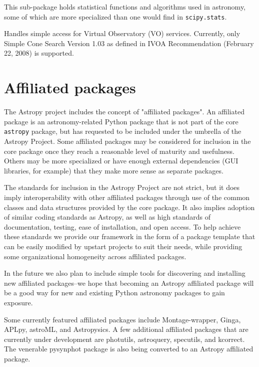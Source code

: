 \documentclass[11pt,twoside]{article}
\begin{document}
This sub-package holds statistical functions and algorithms used in astronomy,
some of which are more specialized than one would find in
\texttt{scipy.stats}.


Handles simple access for Virtual Observatory (VO) services. Currently, only
Simple Cone Search Version 1.03 as defined in IVOA Recommendation (February 22,
2008) is supported.

\section{Affiliated packages}

The Astropy project includes the concept of "affiliated packages".  An
affiliated package is an astronomy-related Python package that is not part of
the core \texttt{astropy} package, but has requested to be included under the
umbrella of the Astropy Project.  Some affiliated packages may be considered
for inclusion in the core package once they reach a reasonable level of
maturity and usefulness.  Others may be more specialized or have enough
external dependencies (GUI libraries, for example) that they make more sense
as separate packages.

The standards for inclusion in the Astropy Project are not strict, but it does
imply interoperability with other affiliated packages through use of the
common classes and data structures provided by the core package.  It also
implies adoption of similar coding standards as Astropy, as well as high
standards of documentation, testing, ease of installation, and open access.
To help achieve these standards we provide our framework in the form of a
package template that can be easily modified by upstart projects to suit
their needs, while providing some organizational homogeneity across affiliated
packages.

In the future we also plan to include simple tools for discovering and
installing new affiliated packages--we hope that becoming an Astropy
affiliated package will be a good way for new and existing Python astronomy
packages to gain exposure.

Some currently featured affiliated packages include Montage-wrapper, Ginga,
APLpy, astroML, and Astropysics.  A few additional affiliated packages that
are currently under development are photutils, astroquery, specutils, and
kcorrect.  The venerable pysynphot package is also being converted to an
Astropy affiliated package.
\end{document}
